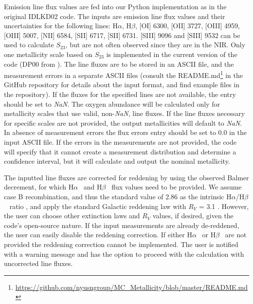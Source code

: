 \documentclass{emulateapj}
\newcommand{\ha}{H$\alpha$}
\newcommand{\hb}{H$\beta$}
\begin{document}
Emission line flux values are fed into our Python implementation as in the original IDLKD02 code. The inputs are emission line flux values and their uncertainties for the following lines: \ha, \hb, [OI] 6300, [OII] 3727, [OIII] 4959, [OIII] 5007, [NII] 6584, [SII] 6717, [SII] 6731.  [SIII] 9096 and [SIII] 9532 can be used to calculate $S_{23}$, but are not often observed since they are in the NIR. Only one metallicity scale  based on $S_{23}$ is implemented in the current version of the code (DP00 from \citealt{diaz00}). The line fluxes are to be stored in an ASCII file, and the measurement errors in a separate ASCII files (consult the README.md\footnote{\url{https://github.com/nyusngroup/MC_Metallicity/blob/master/README.md}} in the GitHub repository for details about the input format, and find example files in the repository). 
 If the fluxes for the specified lines are not available, the entry should be set to \emph{NaN}. The oxygen abundance will be calculated only for metallicity scales that use valid, non-\emph{NaN}, line fluxes. 
If the line fluxes necessary for specific scales are not provided, the output metallicities will default to \emph{NaN}. In absence of measurement errors the flux errors entry should be set to 0.0 in the input ASCII file. If the errors in the measurements are not provided, the code will specify that it cannot create a measurement distribution and determine a confidence interval, but it will calculate and output the nominal metallicity.

The inputted line fluxes are corrected for reddening by using the observed Balmer decrement, for which \ha~ and  \hb~ flux values need to be provided. We assume case B recombination, and thus the standard value of 2.86 as the
intrinsic \ha/\hb~ ratio \citep{osterbrock89}, and apply the standard Galactic reddening law with $R_V$ = 3.1 \citep{cardelli89}. However, the user can choose other extinction laws and $R_V$ values, if desired, given the code's open-source nature. If the input measurements are already de-reddened, the user can easily disable the reddening correction. If either \ha~ or \hb~ are not provided the reddening correction cannot be implemented. The user is notified with a warning message and has the option to proceed with the calculation with uncorrected line fluxes.
\end{document}
